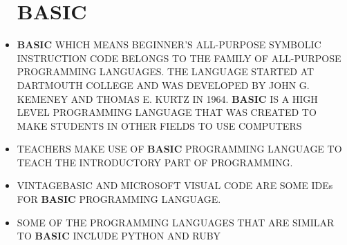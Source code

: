 \documentclass[12pt]{article}
\begin{document}
\begin{itemize}
	\section{BASIC}
	\item
	\textbf{BASIC} WHICH MEANS BEGINNER'S ALL-PURPOSE SYMBOLIC INSTRUCTION CODE BELONGS TO THE FAMILY OF ALL-PURPOSE PROGRAMMING LANGUAGES. THE LANGUAGE STARTED AT DARTMOUTH COLLEGE AND WAS DEVELOPED BY JOHN G. KEMENEY AND THOMAS E. KURTZ IN 1964. \textbf{BASIC} IS A HIGH LEVEL PROGRAMMING LANGUAGE THAT WAS CREATED TO MAKE STUDENTS IN OTHER FIELDS TO USE COMPUTERS
	\item
	TEACHERS MAKE USE OF \textbf{BASIC} PROGRAMMING LANGUAGE TO TEACH THE INTRODUCTORY PART OF PROGRAMMING.
	\item
	VINTAGEBASIC AND MICROSOFT VISUAL CODE ARE SOME IDEs FOR \textbf{BASIC} PROGRAMMING LANGUAGE.
	\item
	SOME OF THE PROGRAMMING LANGUAGES THAT ARE SIMILAR TO \textbf{BASIC} INCLUDE PYTHON AND RUBY
		\end{itemize}

	
\end{document}

